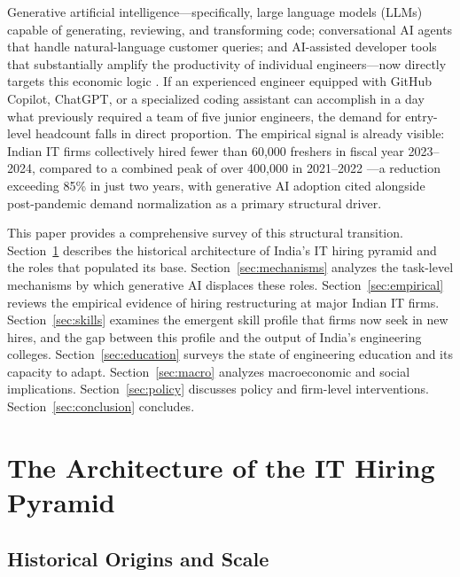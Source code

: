\documentclass[conference]{IEEEtran}
\begin{document}
Generative artificial intelligence---specifically, large language models (LLMs) capable of generating, reviewing, and transforming code; conversational AI agents that handle natural-language customer queries; and AI-assisted developer tools that substantially amplify the productivity of individual engineers---now directly targets this economic logic \cite{eloundou2023gpts}. If an experienced engineer equipped with GitHub Copilot, ChatGPT, or a specialized coding assistant can accomplish in a day what previously required a team of five junior engineers, the demand for entry-level headcount falls in direct proportion. The empirical signal is already visible: Indian IT firms collectively hired fewer than 60,000 freshers in fiscal year 2023--2024, compared to a combined peak of over 400,000 in 2021--2022 \cite{nasscom2024report}---a reduction exceeding 85\% in just two years, with generative AI adoption cited alongside post-pandemic demand normalization as a primary structural driver.

This paper provides a comprehensive survey of this structural transition. Section~\ref{sec:pyramid} describes the historical architecture of India's IT hiring pyramid and the roles that populated its base. Section~\ref{sec:mechanisms} analyzes the task-level mechanisms by which generative AI displaces these roles. Section~\ref{sec:empirical} reviews the empirical evidence of hiring restructuring at major Indian IT firms. Section~\ref{sec:skills} examines the emergent skill profile that firms now seek in new hires, and the gap between this profile and the output of India's engineering colleges. Section~\ref{sec:education} surveys the state of engineering education and its capacity to adapt. Section~\ref{sec:macro} analyzes macroeconomic and social implications. Section~\ref{sec:policy} discusses policy and firm-level interventions. Section~\ref{sec:conclusion} concludes.

\section{The Architecture of the IT Hiring Pyramid}
\label{sec:pyramid}

\subsection{Historical Origins and Scale}
\end{document}

